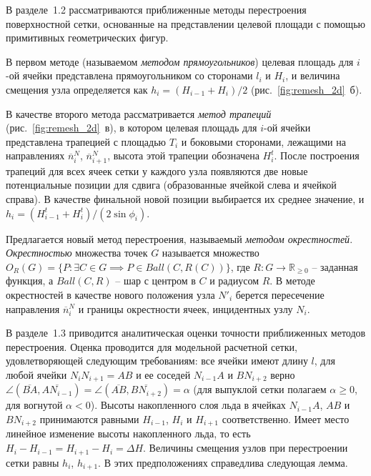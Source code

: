 \documentclass[a4paper,14pt]{extarticle}                     %
\theoremstyle{plain}                                         %
\begin{document}

В разделе~1.2 рассматриваются приближенные методы перестроения поверхностной сетки, основанные на представлении целевой площади с помощью примитивных геометрических фигур.

В первом методе (называемом \textit{методом прямоугольников}) целевая площадь для $i$-ой ячейки представлена прямоугольником со сторонами $l_i$ и $H_i$, и величина смещения узла определяется как $h_i = (H_{i - 1} + H_i)/2$ (рис.~\ref{fig:remesh_2d}~б).

В качестве второго метода рассматривается \textit{метод трапеций} (рис.~\ref{fig:remesh_2d}~в), в котором целевая площадь для $i$-ой ячейки представлена трапецией с площадью $T_i$ и боковыми сторонами, лежащими на направлениях $\overline{n}_i^N$, $\overline{n}_{i + 1}^N$, высота этой трапеции обозначена $H_i^t$.
После построения трапеций для всех ячеек сетки у каждого узла появляются две новые потенциальные позиции для сдвига (образованные ячейкой слева и ячейкой справа).
В качестве финальной новой позиции выбирается их среднее значение, и $h_i = (H_{i - 1}^t + H_i^t) / (2 \sin \phi_i)$.

Предлагается новый метод перестроения, называемый \textit{методом окрестностей}.
\textit{Окрестностью} множества точек $G$ называется множество $O_R(G) = \{ P: \exists C \in G \implies P \in Ball(C, R(C)) \}$, где $R: G \rightarrow \mathbb{R}_{\ge 0}$ -- заданная функция, а $Ball(C, R)$ -- шар с центром в $C$ и радиусом $R$.
В методе окрестностей в качестве нового положения узла $N'_i$ берется пересечение направления $\overline{n}_i^N$ и границы окрестности ячеек, инцидентных узлу $N_i$.


В разделе~1.3 приводится аналитическая оценки точности приближенных методов перестроения.
Оценка проводится для модельной расчетной сетки, удовлетворяющей следующим требованиям: все ячейки имеют длину $l$, для любой ячейки $N_iN_{i + 1} = AB$ и ее соседей $N_{i - 1}A$ и $BN_{i + 2}$ верно $\angle (\overline{BA}, \overline{AN_{i - 1}}) = \angle (\overline{AB}, \overline{BN_{i + 2}}) = \alpha$ (для выпуклой сетки полагаем $\alpha \ge 0$, для вогнутой $\alpha < 0$).
Высоты накопленного слоя льда в ячейках $N_{i - 1}A$, $AB$ и $BN_{i + 2}$ принимаются равными $H_{i - 1}$, $H_i$ и $H_{i + 1}$ соответственно.
Имеет место линейное изменение высоты накопленного льда, то есть $H_i - H_{i - 1} = H_{i + 1} - H_i = \Delta H$.
Величины смещения узлов при перестроении сетки равны $h_i$, $h_{i + 1}$.
В этих предположениях справедлива следующая лемма.
\end{document}
